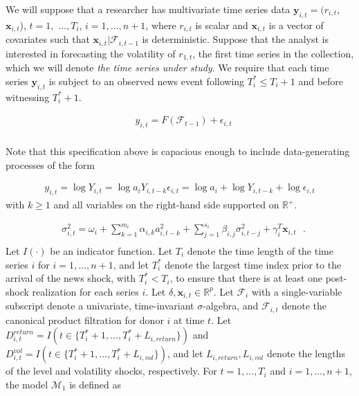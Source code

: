 \documentclass[11pt]{article}
\newcommand{\y}{\textbf{y}}
\newcommand{\x}{\textbf{x}}
\def\mc#1{\mathcal{#1}} %
\def\mc#1{\mathcal{#1}}
\theoremstyle{definition}
\begin{document}
We will suppose that a researcher has multivariate time series data $\y_{i,t} = (r_{i,t}$, $\x_{i,t}$), $t = 1,$ $\ldots,  T_i$, $i = 1, \ldots, n+1$, where $r_{i,t}$ is scalar and $\x_{i,t}$ is a vector of covariates such that $\x_{i,t}|\mathcal{F}_{i,t-1}$ is deterministic.  Suppose that the analyst is interested in forecasting the volatility of $r_{1,t}$, the first time series in the collection, which we will denote \textit{the time series under study}.  We require that each time series $\y_{i,t}$ is subject to an observed news event following $T^*_i \leq T_{i} + 1$ and before witnessing $T^*_i+1$.  

\begin{align*}
  &y_{i,t} = F(\mathcal{F}_{t-1}) + \epsilon_{i,t}\\
\end{align*}

Note that this specification above is capacious enough to include data-generating processes of the form 

\begin{align*} 
  y_{i,t} = \log{Y_{i,t}} = \log{a_{i}Y_{i,t-k}\epsilon_{i,t}} = \log{a_{i}} + \log{Y_{i, t-k}} + \log{\epsilon_{i,t}}
\end{align*}
with $k\geq1$ and all variables on the right-hand side supported on $\mathbb{R}^{+}$.

\begin{align*}
&\sigma_{i,t}^{2} = \omega_{i} + \sum^{m_{i}}_{k=1}\alpha_{i,k}a^{2}_{i,t-k} + \sum_{j=1}^{s_{i}}\beta_{i,j}\sigma_{i,t-j}^{2} + \gamma_{i}^{T} \x_{i,t} \text{ }. \\
\end{align*}
Let $I(\cdot)$ be an indicator function.  Let $T_i$ denote the time length of the time series $i$ for $i = 1, \ldots, n+1$, and let $T_i^*$ denote the largest time index prior to the arrival of the news shock, with $T_i^* < T_i$, to ensure that there is at least one post-shock realization for each series $i$.  Let $\delta, \x_{i,t} \in \mathbb{R}^{p}$.  Let $\mathcal{F}_{i}$ with a single-variable subscript denote a univariate, time-invariant $\sigma$-algebra, and $\mathcal{F}_{i,t}$ denote the canonical product filtration for donor $i$ at time $t$.  Let $D^{return}_{i,t} = I(t \in \{T_i^* + 1,...,T_i^* + L_{i, return}\})$ and $D^{vol}_{i,t} = I(t \in \{T_i^* + 1,...,T_i^* + L_{i, vol}\})$, and let $L_{i,return},L_{i,vol}$ denote the lengths of the level and volatility shocks, respectively.  For $t= 1, \ldots, T_i$ and $i = 1, \ldots, n+1$, the model $\mc{M}_1$ is defined as 
\end{document}
